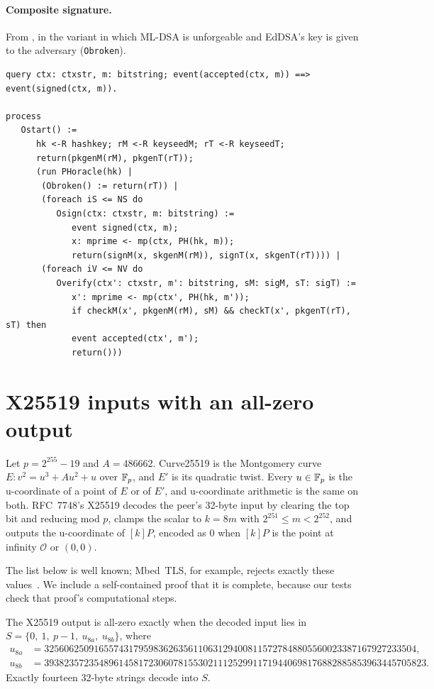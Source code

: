 \paragraph{Composite signature.} From , in the
variant in which ML-DSA is unforgeable and EdDSA's key is given to the
adversary (\texttt{Obroken}).
\begin{lstlisting}
query ctx: ctxstr, m: bitstring; event(accepted(ctx, m)) ==> event(signed(ctx, m)).

process
   Ostart() :=
      hk <-R hashkey; rM <-R keyseedM; rT <-R keyseedT;
      return(pkgenM(rM), pkgenT(rT));
      (run PHoracle(hk) |
       (Obroken() := return(rT)) |
       (foreach iS <= NS do
          Osign(ctx: ctxstr, m: bitstring) :=
             event signed(ctx, m);
             x: mprime <- mp(ctx, PH(hk, m));
             return(signM(x, skgenM(rM)), signT(x, skgenT(rT)))) |
       (foreach iV <= NV do
          Overify(ctx': ctxstr, m': bitstring, sM: sigM, sT: sigT) :=
             x': mprime <- mp(ctx', PH(hk, m'));
             if checkM(x', pkgenM(rM), sM) && checkT(x', pkgenT(rT), sT) then
             event accepted(ctx', m');
             return()))
\end{lstlisting}

\section{X25519 inputs with an all-zero output}\label{app:loworder}

Let $p = 2^{255} - 19$ and $A = 486662$. Curve25519 is the Montgomery curve
$E : v^2 = u^3 + A u^2 + u$ over $\mathbb{F}_p$, and $E'$ is its quadratic twist.
Every $u \in \mathbb{F}_p$ is the u-coordinate of a point of $E$ or of $E'$, and
u-coordinate arithmetic is the same on both. RFC~7748's X25519 decodes the
peer's 32-byte input by clearing the top bit and reducing mod $p$, clamps the
scalar to $k = 8m$ with $2^{251} \le m < 2^{252}$, and outputs the
u-coordinate of $[k]P$, encoded as 0 when $[k]P$ is the point at infinity
$\mathcal{O}$ or $(0,0)$.

The list below is well known; Mbed~TLS, for example, rejects exactly these
values~\cite{mbedtls}. We include a self-contained proof that it is
complete, because our tests check that proof's computational steps.

\begin{lemma}
The X25519 output is all-zero exactly when the decoded input lies in
$S = \{0,\ 1,\ p-1,\ u_{8a},\ u_{8b}\}$, where
{\small
\begin{align*}
u_{8a} &= 325606250916557431795983626356110631294008115727848805560023387167927233504,\\
u_{8b} &= 39382357235489614581723060781553021112529911719440698176882885853963445705823.
\end{align*}}
Exactly fourteen 32-byte strings decode into $S$.
\end{lemma}

